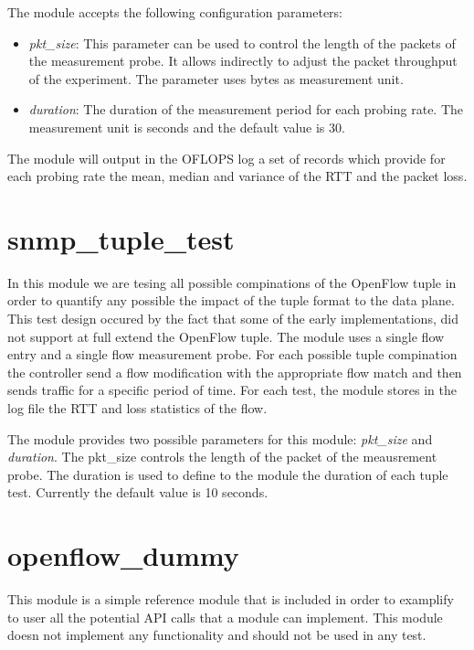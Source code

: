 \documentclass{book}
\begin{document}
The module accepts the following configuration parameters:
\begin{itemize}
\item \emph{pkt\_size}: This parameter can be used to control the length of the
packets of the measurement probe. It allows indirectly to adjust the packet
throughput of the experiment. The parameter uses bytes as measurement unit.
\item \emph{duration}: The duration of the measurement period for each probing
rate. The measurement unit is seconds and the default value is 30. 
\end{itemize}

The module will output in the OFLOPS log a set of records which provide for each
probing rate the mean, median and variance of the RTT and the packet loss. 

\section{snmp\_tuple\_test}

In this module we are tesing all possible compinations of the OpenFlow tuple in
order to quantify any possible the impact of the tuple format to the data plane. This test
design occured by the fact that some of the early implementations, did not
support at full extend the OpenFlow tuple. The module uses a single flow entry
and a single flow measurement probe. For each possible tuple compination the
controller send a flow modification with the appropriate flow match and then
sends traffic for a specific period of time. For each test, the module stores in the
log file the RTT and loss statistics of the flow. 

The module provides two possible parameters for this module: \emph{pkt\_size}
and \emph{duration}. The pkt\_size controls the length of the packet of the
meausrement probe. The duration is used to define to the module the duration of
each tuple test. Currently the default value is 10 seconds. 

\section{openflow\_dummy}

This module is a simple reference module that is included in order to examplify
to user all the potential API calls that a module can implement. This module
doesn not implement any functionality and should not be used in any test.
\end{document}
